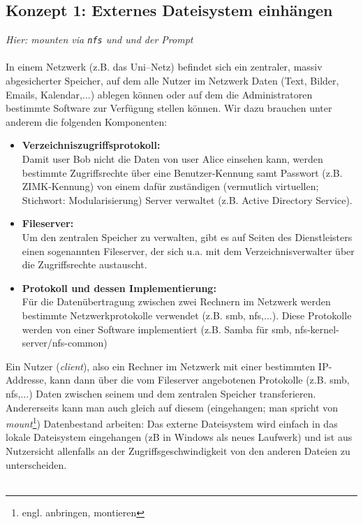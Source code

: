 \subsection{Konzept 1: Externes Dateisystem einhängen}
\textit{Hier: \textit{mounten} via \texttt{nfs} und  und der  Prompt}\\~\\
In einem Netzwerk (z.B. das Uni--Netz) befindet sich ein zentraler, massiv abgesicherter Speicher, auf dem alle Nutzer im Netzwerk Daten (Text, Bilder, Emails, Kalendar,...) ablegen können oder auf dem die Administratoren bestimmte Software zur Verfügung stellen können. Wir dazu brauchen unter anderem die folgenden Komponenten:
\begin{itemize}
	\item \textbf{Verzeichniszugriffsprotokoll:}\\ Damit user Bob nicht die Daten von user Alice einsehen kann, werden bestimmte Zugriffsrechte über eine Benutzer-Kennung samt Passwort (z.B. ZIMK-Kennung) von einem dafür zuständigen (vermutlich virtuellen; Stichwort: Modularisierung) Server verwaltet (z.B. Active Directory Service).
	\item \textbf{Fileserver:}\\ Um den zentralen Speicher zu verwalten, gibt es auf Seiten des Dienstleisters einen sogenannten Fileserver, der sich u.a. mit dem Verzeichnisverwalter über die Zugriffsrechte austauscht.
	\item \textbf{Protokoll und dessen Implementierung:}\\
	Für die Datenübertragung zwischen zwei Rechnern im Netzwerk werden bestimmte Netzwerkprotokolle verwendet (z.B. smb, nfs,...). Diese Protokolle werden von einer Software implementiert (z.B. Samba für smb, nfs-kernel-server/nfs-common)
\end{itemize}
Ein Nutzer (\textit{client}), also ein Rechner im Netzwerk mit einer bestimmten IP-Addresse, kann dann über die vom Fileserver angebotenen Protokolle (z.B. smb, nfs,...) Daten zwischen seinem und dem zentralen Speicher transferieren.\\
Andererseits kann man auch gleich auf diesem (eingehangen; man spricht von \textit{mount}\footnote{engl. anbringen, montieren}) Datenbestand arbeiten: Das externe Dateisystem wird einfach in das lokale Dateisystem eingehangen (zB in Windows als neues Laufwerk) und ist aus Nutzersicht allenfalls an der Zugriffsgeschwindigkeit von den anderen Dateien zu unterscheiden.~\\
~\\
